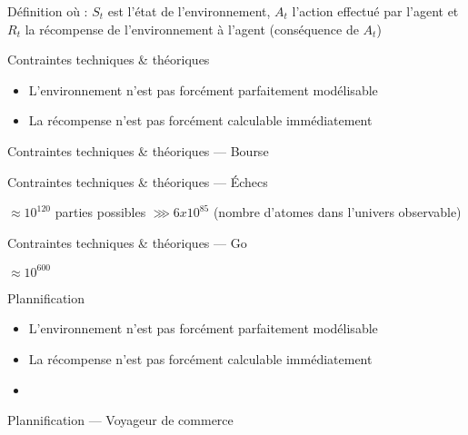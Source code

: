 \begin{frame}{Définition}
  où :
  \newline
  $S_t$ est l'état de l'environnement,
  \newline
  $A_t$ l'action effectué par l'agent et
  \newline
  $R_t$ la récompense de l'environnement à l'agent (conséquence de $A_t$)
\end{frame}

\begin{frame}{Contraintes techniques \& théoriques}
  \begin{itemize}[<+->]
    \item L'environnement n'est pas forcément parfaitement modélisable
    \item La récompense n'est pas forcément calculable immédiatement
  \end{itemize}
\end{frame}

\begin{frame}{Contraintes techniques \& théoriques --- Bourse}
\end{frame}

\begin{frame}{Contraintes techniques \& théoriques --- Échecs}
  \begin{center}
  \end{center}
  \pause
  \begin{center}
    $\approx 10^{120}$ parties possibles $\ggg 6 x 10^{85}$
    \newline
    (nombre d'atomes dans l'univers observable)
  \end{center}
\end{frame}

\begin{frame}{Contraintes techniques \& théoriques --- Go}
  \begin{center}
    \huge{$\approx 10^{600}$}
  \end{center}
\end{frame}

\begin{frame}{Plannification}
  \begin{itemize}
  \item L'environnement n'est pas forcément parfaitement modélisable
  \item La récompense n'est pas forcément calculable immédiatement
  \item {}
  \end{itemize}
\end{frame}

\begin{frame}{Plannification --- Voyageur de commerce}
\end{frame}

